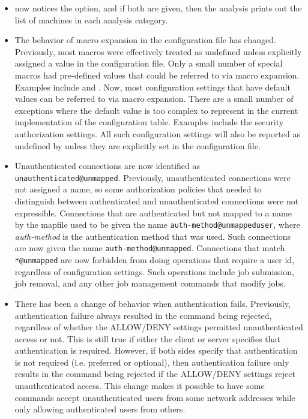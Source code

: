 \begin{itemize}

\item {}  now notices the  option, and if both
are given, then the analysis prints out the list of machines
in each analysis category.

\item The behavior of macro expansion in the configuration file has
  changed.  Previously, most macros were effectively treated as
  undefined unless explicitly assigned a value in the configuration
  file.  Only a small number of special macros had pre-defined values
  that could be referred to via macro expansion.  Examples include
   and .  Now, most
  configuration settings that have default values can be referred to
  via macro expansion.  There are a small number of exceptions where
  the default value is too complex to represent in the current
  implementation of the configuration table.  Examples include the
  security authorization settings. All such configuration settings
  will also be reported as undefined by  unless
  they are explicitly set in the configuration file.

\item Unauthenticated connections are now identified as
  \verb|unauthenticated@unmapped|.  Previously, unauthenticated
  connections were not assigned a name, so some authorization policies
  that needed to distinguish between authenticated and unauthenticated
  connections were not expressible.  Connections that are
  authenticated but not mapped to a name by the mapfile used to be
  given the name \verb|auth-method@unmappeduser|, where
  \emph{auth-method} is the authentication method that was used.  Such
  connections are now given the name \verb|auth-method@unmapped|.
  Connections that match \verb|*@unmapped| are now forbidden from
  doing operations that require a user id, regardless of configuration
  settings.  Such operations include job submission, job removal, and
  any other job management commands that modify jobs.

\item There has been a change of behavior when authentication fails.
  Previously, authentication failure always resulted in the command
  being rejected, regardless of whether the ALLOW/DENY settings
  permitted unauthenticated access or not.  This is still true if either
  the client or server specifies that authentication is required.
  However, if both sides specify that authentication is not required
  (i.e. preferred or optional), then authentication failure only results
  in the command being rejected if the ALLOW/DENY settings reject
  unauthenticated access.  This change makes it possible to have some
  commands accept unauthenticated users from some network addresses
  while only allowing authenticated users from others.


\end{itemize}
